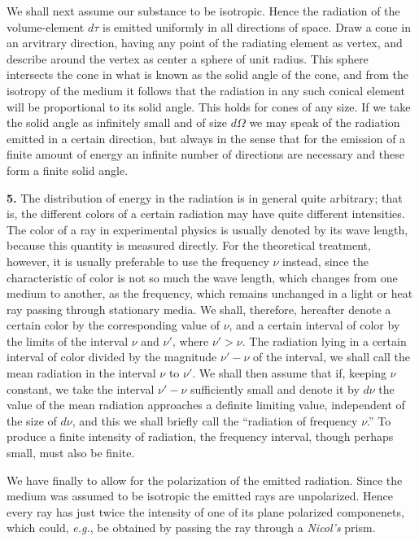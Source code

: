 \documentclass[12pt,oneside]{book}
\begin{document}
We shall next assume our substance to be isotropic. Hence the  radiation of the volume-element $d\tau$ is emitted uniformly in all directions of space. Draw a cone in an arvitrary direction, having any point of the radiating element as vertex, and describe around the vertex as center a sphere of unit radius. This sphere intersects the cone in what is known as the solid angle of the cone, and from the isotropy of the medium it follows that the radiation in any such conical element will be proportional to its solid angle. This holds for cones of any size. If we take the solid angle as infinitely small and of size $d\Omega$ we may speak of the radiation emitted in a certain direction, but always in the sense that for the emission of a finite amount of energy an infinite number of directions are necessary and these form a finite solid angle. \par 

\textbf{5.} The distribution of energy in the radiation is in general quite arbitrary; that is, the different colors of a certain radiation may have quite different intensities. The color of a ray in experimental physics is usually denoted by its wave length, because this quantity is measured directly. For the theoretical treatment, however, it is usually preferable to use the frequency $\nu$ instead, since the characteristic of color is not so much the wave length, which changes from one medium to another, as the frequency, which remains unchanged in a light or heat ray passing through stationary media. We shall, therefore, hereafter denote a certain color by the corresponding value of $\nu$, and a certain interval of color by the limits of the interval $\nu$ and $\nu'$, where $\nu'>\nu$. The radiation lying in a certain interval of color divided by the magnitude $\nu'-\nu$ of the interval, we shall call the mean radiation in the interval $\nu$ to $\nu'$. We shall then assume that if, keeping $\nu$ constant, we take the interval $\nu'-\nu$ sufficiently small and denote it by $d\nu$ the value of the mean radiation approaches a definite limiting value, independent of the size of $d\nu$, and this we shall briefly call the ``radiation of frequency $\nu$.'' To produce a finite intensity of radiation, the frequency interval, though perhaps small, must also be finite. \par 

We have finally to allow for the polarization of the emitted radiation. Since the medium was assumed to be isotropic the emitted rays are unpolarized. Hence every ray has just twice the intensity of one of its plane polarized componenets, which could, \textit{e.g.}, be obtained by passing the ray through a \textit{Nicol's} prism. \par 
\end{document}
